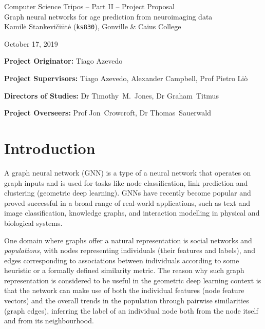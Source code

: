 \documentclass[12pt,a4paper,twoside, hidelinks]{article}
\begin{document}
\begin{center}
\Large
Computer Science Tripos -- Part II -- Project Proposal\\[4mm]
\LARGE
Graph neural networks for age prediction from neuroimaging data \\[4mm]

\large
Kamilė Stankevičiūtė (\texttt{ks830}), Gonville \& Caius College

October 17, 2019 %
\end{center}

\vspace{5mm}
\textbf{Project Originator:} Tiago Azevedo

\textbf{Project Supervisors:} Tiago Azevedo, Alexander Campbell, Prof Pietro Liò

\textbf{Directors of Studies:} Dr Timothy~M.~Jones, Dr Graham~Titmus

\textbf{Project Overseers:} Prof Jon~Crowcroft, Dr Thomas~Sauerwald


\section*{Introduction}


A graph neural network (GNN) is a type of a neural network that operates on graph inputs and is used for tasks like node classification, link prediction and clustering (geometric deep learning). GNNs have recently become popular and proved successful in a broad range of real-world applications, such as text and image classification, knowledge graphs, and interaction modelling in physical and biological systems. \cite{zhou2018gnn}

One domain where graphs offer a natural representation is social networks and \textit{populations}, with nodes representing individuals (their features and labels), and edges corresponding to associations between individuals according to some heuristic or a formally defined similarity metric. The reason why such graph representation is considered to be useful in the geometric deep learning context is that the network can make use of both the individual features (node feature vectors) and the overall trends in the population through pairwise similarities (graph edges), \cite{parisot2017spectral} inferring the label of an individual node both from the node itself and from its neighbourhood.
\end{document}
